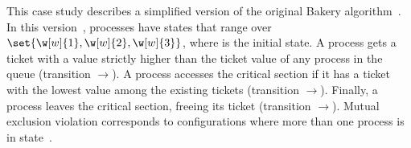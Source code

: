%
\begin{wrapfigure}{r}[0pt]{0.3\linewidth}
\hfill%
\end{wrapfigure}
%
This case study describes a simplified version of the original Bakery
algorithm~\cite{Lamport:Bakery}.
%
In this version~\cite{Marcus:thesis}, processes have states that range
over~$\set{\w[w]{1},\w[w]{2},\w[w]{3}}$, where  is the initial
state.
%
A process gets a ticket with a value strictly higher than the ticket
value of any process in the queue (transition
$\rightarrow$).
%
A process accesses the critical section if it has a ticket with the
lowest value among the existing tickets (transition
$\rightarrow$).
%
Finally, a process leaves the critical section, freeing its ticket
(transition $\rightarrow$).
%
Mutual exclusion violation corresponds to configurations where more
than one process is in state~.
